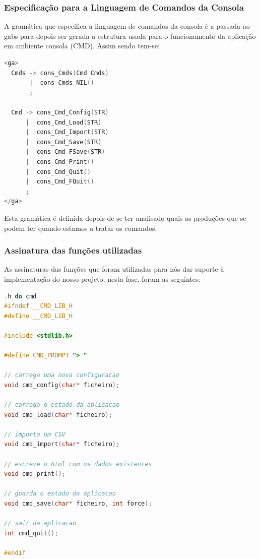 \documentclass[11pt, a4paper, oneside]{article}
\begin{document}
\subsubsection{Especificação para a Linguagem de Comandos da Consola}
A gramática que especifica a linguagem de comandos da consola é a passada ao \textsf{gabs} para depois ser gerada a estrutura usada para o funcionamento da aplicação em ambiente consola (CMD). Assim sendo tem-se:
\begin{lstlisting}[language=C, caption={Gramática para a linguagem de especificação para a linguagem de comandos de consola.}]
<ga>
  Cmds -> cons_Cmds(Cmd Cmds)
       |  cons_Cmds_NIL()
       ;

  Cmd -> cons_Cmd_Config(STR)
      |  cons_Cmd_Load(STR)
      |  cons_Cmd_Import(STR)
      |  cons_Cmd_Save(STR)
      |  cons_Cmd_FSave(STR)
      |  cons_Cmd_Print()
      |  cons_Cmd_Quit()
      |  cons_Cmd_FQuit()
      ;
</ga>
\end{lstlisting}

Esta gramática é definida depois de se ter analisado quais as produções que se podem ter quando estamos a tratar os comandos.

\subsubsection{Assinatura das funções utilizadas}
As assinaturas das funções que foram utilizadas para nós dar suporte à implementação do nosso projeto, nesta fase, foram as seguintes:

\begin{lstlisting}[language=C, caption={Construtores do ficheiro de consola.}]
.h do cmd
#ifndef __CMD_LIB_H
#define __CMD_LIB_H

#include <stdlib.h>

#define CMD_PROMPT "> "

// carrega uma nova configuracao
void cmd_config(char* ficheiro);

// carrega o estado da aplicacao
void cmd_load(char* ficheiro);

// importa um CSV
void cmd_import(char* ficheiro);

// escreve o html com os dados existentes
void cmd_print();

// guarda o estado da aplicacao
void cmd_save(char* ficheiro, int force);

// sair da aplicacao
int cmd_quit();

#endif
\end{lstlisting} 
\end{document}
